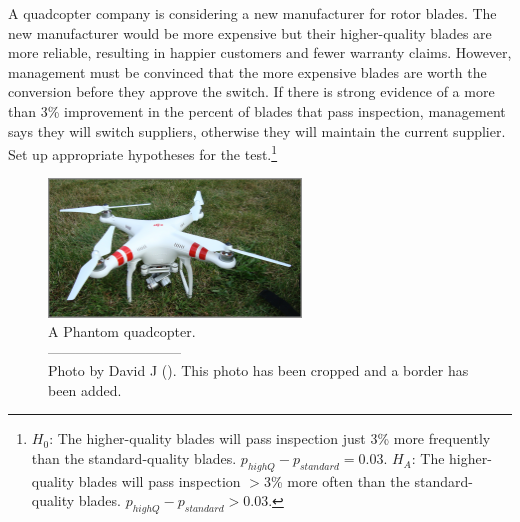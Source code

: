 \begin{exercise}\label{carWheelBladeManufacturer}
A quadcopter company is considering a new manufacturer for rotor blades. The new manufacturer would be more expensive but their higher-quality blades are more reliable, resulting in happier customers and fewer warranty claims. However, management must be convinced that the more expensive blades are worth the conversion before they approve the switch. If there is strong evidence of a more than 3\% improvement in the percent of blades that pass inspection, management says they will switch suppliers, otherwise they will maintain the current supplier. Set up appropriate hypotheses for the test.\footnote{$H_0$: The higher-quality blades will pass inspection just 3\% more frequently than the standard-quality blades. $p_{highQ} - p_{standard} = 0.03$. $H_A$: The higher-quality blades will pass inspection $>$3\% more often than the standard-quality blades. $p_{highQ} - p_{standard} > 0.03$.}
\end{exercise}

\setlength{\captionwidth}{85mm}

\begin{figure}
\centering
\includegraphics[width=0.6\textwidth]{ch_inference_for_props/figures/quadcopter/quadcopter_david_j}
\caption{A Phantom quadcopter.\vspace{-1mm} \\
   -----------------------------\vspace{-2mm}\\
   {\footnotesize Photo by David J ().  This photo has been cropped and a border has been added.}}
\label{quadcopter_david_j}
\end{figure}

\setlength{\captionwidth}{\mycaptionwidth}


